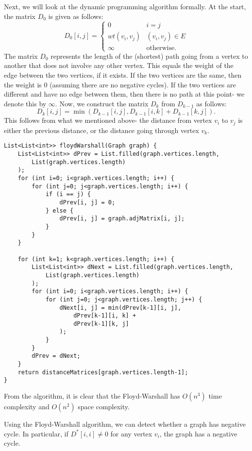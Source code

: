 \documentclass[a4paper, openany]{memoir}
\begin{document}
    Next, we will look at the dynamic programming algorithm formally. At the start, the matrix $D_0$ is given as follows:
    \[D_0[i, j] = \begin{cases}
        0 & i = j \\
        wt(v_i, v_j) & (v_i, v_j) \in E \\
        \infty & \text{otherwise}.
    \end{cases}\]
    The matrix $D_0$ represents the length of the (shortest) path going from a vertex to another that does not involve any other vertex. This equals the weight of the edge between the two vertices, if it exists. If the two vertices are the same, then the weight is 0 (assuming there are no negative cycles). If the two vertices are different and have no edge between them, then there is no path at this point- we denote this by $\infty$. Now, we construct the matrix $D_k$ from $D_{k-1}$ as follows:
    \[D_k[i, j] = \min (D_{k-1}[i, j], D_{k-1}[i, k] + D_{k-1}[k, j]).\]
    This follows from what we mentioned above- the distance from vertex $v_i$ to $v_j$ is either the previous distance, or the distance going through vertex $v_k$.

\begin{lstlisting}[language=pseudocode]
List<List<int>> floydWarshall(Graph graph) {
    List<List<int>> dPrev = List.filled(graph.vertices.length, 
        List(graph.vertices.length)
    );
    for (int i=0; i<graph.vertices.length; i++) {
        for (int j=0; j<graph.vertices.length; i++) {
            if (i == j) {
                dPrev[i, j] = 0;
            } else {
                dPrev[i, j] = graph.adjMatrix[i, j];
            }
        }
    }

    for (int k=1; k<graph.vertices.length; i++) {
        List<List<int>> dNext = List.filled(graph.vertices.length, 
            List(graph.vertices.length)
        );
        for (int i=0; i<graph.vertices.length; i++) {
            for (int j=0; j<graph.vertices.length; j++) {
                dNext[i, j] = min(dPrev[k-1][i, j],
                    dPrev[k-1][i, k] + 
                    dPrev[k-1][k, j]
                );
            }
        }
        dPrev = dNext;
    }
    return distanceMatrices[graph.vertices.length-1];
}
\end{lstlisting}
    From the algorithm, it is clear that the Floyd-Warshall has $O(n^3)$ time complexity and $O(n^2)$ space complexity.

    Using the Floyd-Warshall algorithm, we can detect whether a graph has negative cycle. In particular, if $D^*[i, i] \neq 0$ for any vertex $v_i$, the graph has a negative cycle.
\end{document}
